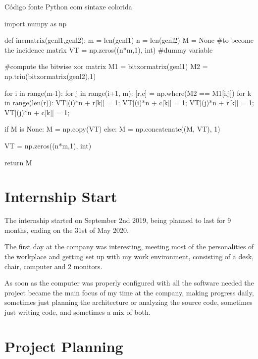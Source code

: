 \begin{listing}[H]
    \caption{Código fonte Python com sintaxe colorida}
    \label{ls:bash}
    \begin{pythoncode}
import numpy as np

def incmatrix(genl1,genl2):
    m = len(genl1)
    n = len(genl2)
    M = None #to become the incidence matrix
    VT = np.zeros((n*m,1), int)  #dummy variable

    #compute the bitwise xor matrix
    M1 = bitxormatrix(genl1)
    M2 = np.triu(bitxormatrix(genl2),1) 

    for i in range(m-1):
        for j in range(i+1, m):
            [r,c] = np.where(M2 == M1[i,j])
            for k in range(len(r)):
                VT[(i)*n + r[k]] = 1;
                VT[(i)*n + c[k]] = 1;
                VT[(j)*n + r[k]] = 1;
                VT[(j)*n + c[k]] = 1;

                if M is None:
                    M = np.copy(VT)
                else:
                    M = np.concatenate((M, VT), 1)

                VT = np.zeros((n*m,1), int)

return M
    \end{pythoncode}
\end{listing}


\section{Internship Start}

The internship started on September 2nd 2019, being planned to last for 9 months, ending on the 31st of May 2020.

The first day at the company was interesting, meeting most of the personalities of the workplace and getting set up with my work environment,
consisting of a desk, chair, computer and 2 monitors.

As soon as the computer was properly configured with all the software needed the project became the main focus of my time at the company,
making progress daily, sometimes just planning the architecture or analyzing the source code, sometimes just writing code, and sometimes a mix of both.

\section{Project Planning}

